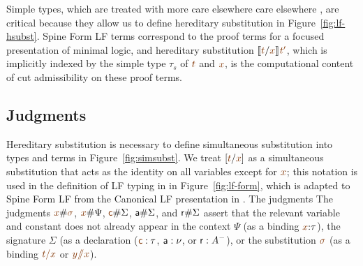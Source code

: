Simple types, which are treated with more care elsewhere care
elsewhere \cite{harper07mechanizing,reed09hybrid}, are critical
because they allow us to define hereditary substitution in
Figure~\ref{fig:lf-hsubst}. Spine Form LF terms correspond to the
proof terms for a focused presentation of minimal logic, and
hereditary substitution $\rsubst{\lf t}{\lf x}{\lf{t'}}$, which is
implicitly indexed by the simple type $\tau_s$ of $\lf t$ and $\lf x$,
is the computational content of cut admissibility on these proof
terms. 

\subsection{Judgments}

Hereditary substitution is necessary to define simultaneous
substitution into types and terms in Figure~\ref{fig:simsubst}. We treat
$[\lf{t}/\lf{x}]$ as a simultaneous substitution that acts as the
identity on all variables except for $\lf{x}$; this 
notation is used
in the definition of LF typing in in Figure~\ref{fig:lf-form}, which
is adapted to Spine Form LF from the Canonical LF presentation in
\cite{harper07mechanizing}. The judgments 
The
judgments $\lf{x}\#\lf{\sigma}$, $\lf{x}\#\Psi$, $\lf{\sf
  c}\#\Sigma$, ${\sf a}\#\Sigma$, and ${\sf r}\#\Sigma$ assert that
the relevant variable and constant does not already appear in the
context $\Psi$ (as a binding $\lf{x}{:}\tau$), the signature $\Sigma$
(as a declaration ($\lf{\sf c} : \tau$, ${\sf a} : \nu$, or 
${\sf r} : A^-$), or the substitution
$\lf{\sigma}$ (as a binding $\lf{t/x}$ or \mbox{$\lf{y/\!\!/x}$}). 

